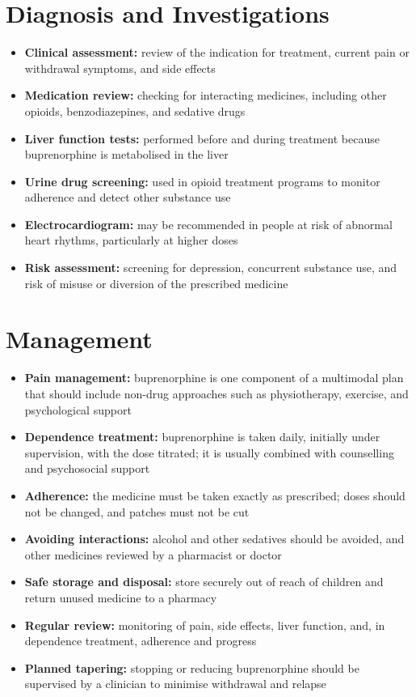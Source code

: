 \section*{Diagnosis and Investigations}
\begin{itemize}
    \item \textbf{Clinical assessment:} review of the indication for treatment, current pain or withdrawal symptoms, and side effects
    \item \textbf{Medication review:} checking for interacting medicines, including other opioids, benzodiazepines, and sedative drugs
    \item \textbf{Liver function tests:} performed before and during treatment because buprenorphine is metabolised in the liver
    \item \textbf{Urine drug screening:} used in opioid treatment programs to monitor adherence and detect other substance use
    \item \textbf{Electrocardiogram:} may be recommended in people at risk of abnormal heart rhythms, particularly at higher doses
    \item \textbf{Risk assessment:} screening for depression, concurrent substance use, and risk of misuse or diversion of the prescribed medicine
\end{itemize}

\section*{Management}
\begin{itemize}
    \item \textbf{Pain management:} buprenorphine is one component of a multimodal plan that should include non-drug approaches such as physiotherapy, exercise, and psychological support
    \item \textbf{Dependence treatment:} buprenorphine is taken daily, initially under supervision, with the dose titrated; it is usually combined with counselling and psychosocial support
    \item \textbf{Adherence:} the medicine must be taken exactly as prescribed; doses should not be changed, and patches must not be cut
    \item \textbf{Avoiding interactions:} alcohol and other sedatives should be avoided, and other medicines reviewed by a pharmacist or doctor
    \item \textbf{Safe storage and disposal:} store securely out of reach of children and return unused medicine to a pharmacy
    \item \textbf{Regular review:} monitoring of pain, side effects, liver function, and, in dependence treatment, adherence and progress
    \item \textbf{Planned tapering:} stopping or reducing buprenorphine should be supervised by a clinician to minimise withdrawal and relapse
\end{itemize}

